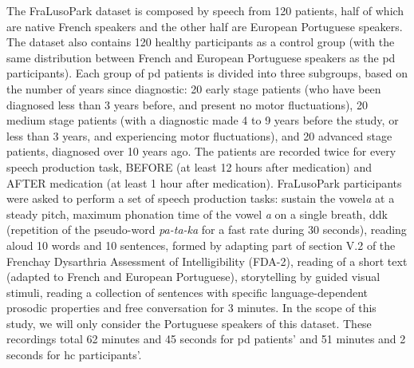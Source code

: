 The FraLusoPark dataset is composed by speech from 120 patients, half of which are native French speakers and the other half are European Portuguese speakers. The dataset also contains 120 healthy participants as a control group (with the same distribution between French and European Portuguese speakers as the \gls{pd} participants). Each group of \gls{pd} patients is divided into three subgroups, based on the number of years since diagnostic: 20 early stage patients (who have been diagnosed less than 3 years before, and present no motor fluctuations), 20 medium stage patients (with a diagnostic made 4 to 9 years before the study, or less than 3 years, and experiencing motor fluctuations), and 20 advanced stage patients, diagnosed over 10 years ago. The patients are recorded twice for every speech production task, BEFORE (at least 12 hours after medication) and AFTER medication (at least 1 hour after medication). FraLusoPark participants were asked to perform a set of speech production tasks: sustain the vowel\textit{\/a\/} at a steady pitch, maximum phonation time of the vowel \textit{\/a\/} on a single breath, \gls{ddk} (repetition of the pseudo-word \textit{\/pa-ta-ka\/} for a fast rate during 30 seconds), reading aloud 10 words and 10 sentences, formed by adapting part of section V.2 of the Frenchay Dysarthria Assessment of Intelligibility (FDA-2), reading of a short text (adapted to French and European Portuguese), storytelling by guided visual stimuli, reading a collection of sentences with specific language-dependent prosodic properties and free conversation for 3 minutes. In the scope of this study, we will only consider the Portuguese speakers of this dataset. These recordings total 62 minutes and 45 seconds for \gls{pd} patients' and 51 minutes and 2 seconds for \gls{hc} participants'.

